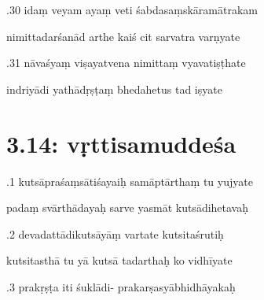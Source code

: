\documentclass[article,12pt,a4paper]{memoir}%
\newcounter{parCount}
\begin{document}
	  
	  \pstart {}.30 idaṃ veyam ayaṃ veti śabdasaṃskāramātrakam 
	{}
	\pend%
      

	  
	  \pstart \leavevmode%
	nimittadarśanād arthe kaiś cit sarvatra varṇyate 
	{}
	\pend%
      

	  
	  \pstart {}.31 nāvaśyaṃ viṣayatvena nimittaṃ vyavatiṣṭhate 
	{}
	\pend%
      

	  
	  \pstart \leavevmode%
	indriyādi yathādṛṣṭaṃ bhedahetus tad iṣyate 
	{}
	\pend%
      
	  
	
\chapter[{3.14: vṛttisamuddeśa}][{3.14: vṛttisamuddeśa}]{3.14: vṛttisamuddeśa}

	  
	  \pstart {}.1 kutsāpraśaṃsātiśayaiḥ samāptārthaṃ tu yujyate 
	{}
	\pend%
      

	  
	  \pstart \leavevmode%
	padaṃ svārthādayaḥ sarve yasmāt kutsādihetavaḥ 
	{}
	\pend%
      

	  
	  \pstart {}.2 devadattādikutsāyāṃ vartate kutsitaśrutiḥ 
	{}
	\pend%
      

	  
	  \pstart \leavevmode%
	kutsitasthā tu yā kutsā tadarthaḥ ko vidhīyate 
	{}
	\pend%
      

	  
	  \pstart {}.3 prakṛṣṭa iti śuklādi- prakarṣasyābhidhāyakaḥ 
	{}
	\pend%
      
\end{document}
